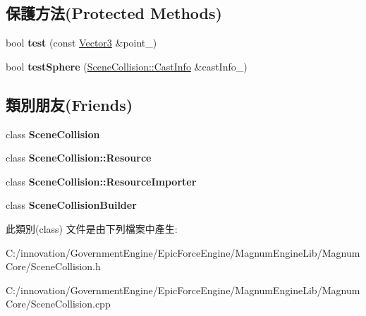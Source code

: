 \subsection*{保護方法(Protected Methods)}
\begin{DoxyCompactItemize}
\item 
bool {\bfseries test} (const \hyperlink{class_i_dream_sky_1_1_vector3}{Vector3} \&point\+\_\+)\hypertarget{class_i_dream_sky_1_1_scene_collision_1_1_height_field_a5cd4318b7ad9284bcb994cd1659f2814}{}\label{class_i_dream_sky_1_1_scene_collision_1_1_height_field_a5cd4318b7ad9284bcb994cd1659f2814}

\item 
bool {\bfseries test\+Sphere} (\hyperlink{class_i_dream_sky_1_1_scene_collision_1_1_cast_info}{Scene\+Collision\+::\+Cast\+Info} \&cast\+Info\+\_\+)\hypertarget{class_i_dream_sky_1_1_scene_collision_1_1_height_field_a3ae2a2040b7ffac05f81f937db37d4b8}{}\label{class_i_dream_sky_1_1_scene_collision_1_1_height_field_a3ae2a2040b7ffac05f81f937db37d4b8}

\end{DoxyCompactItemize}
\subsection*{類別朋友(Friends)}
\begin{DoxyCompactItemize}
\item 
class {\bfseries Scene\+Collision}\hypertarget{class_i_dream_sky_1_1_scene_collision_1_1_height_field_a7f7f4483f99e66d8de91c12344383316}{}\label{class_i_dream_sky_1_1_scene_collision_1_1_height_field_a7f7f4483f99e66d8de91c12344383316}

\item 
class {\bfseries Scene\+Collision\+::\+Resource}\hypertarget{class_i_dream_sky_1_1_scene_collision_1_1_height_field_a71b236c1c24fec68b8fc80e32c6a1df9}{}\label{class_i_dream_sky_1_1_scene_collision_1_1_height_field_a71b236c1c24fec68b8fc80e32c6a1df9}

\item 
class {\bfseries Scene\+Collision\+::\+Resource\+Importer}\hypertarget{class_i_dream_sky_1_1_scene_collision_1_1_height_field_a7892633f22a5e0a8a9dcf89bb56cdff8}{}\label{class_i_dream_sky_1_1_scene_collision_1_1_height_field_a7892633f22a5e0a8a9dcf89bb56cdff8}

\item 
class {\bfseries Scene\+Collision\+Builder}\hypertarget{class_i_dream_sky_1_1_scene_collision_1_1_height_field_a2d946a399a3297cd5ab77a3604b6211e}{}\label{class_i_dream_sky_1_1_scene_collision_1_1_height_field_a2d946a399a3297cd5ab77a3604b6211e}

\end{DoxyCompactItemize}


此類別(class) 文件是由下列檔案中產生\+:\begin{DoxyCompactItemize}
\item 
C\+:/innovation/\+Government\+Engine/\+Epic\+Force\+Engine/\+Magnum\+Engine\+Lib/\+Magnum\+Core/Scene\+Collision.\+h\item 
C\+:/innovation/\+Government\+Engine/\+Epic\+Force\+Engine/\+Magnum\+Engine\+Lib/\+Magnum\+Core/Scene\+Collision.\+cpp\end{DoxyCompactItemize}
